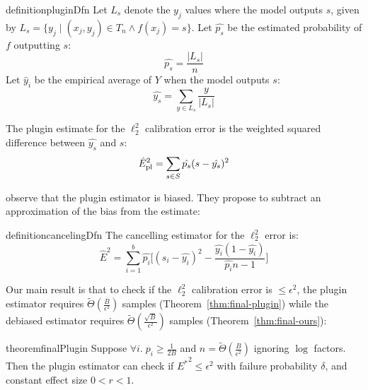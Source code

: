 \begin{restatable}{definition}{pluginDfn}
\label{dfn:plugin-estimator}
  Let $L_s$ denote the $y_j$ values where the model outputs $s$, given by $L_s = \{ y_j \; | \; (x_j, y_j) \in T_n\wedge f(x_j) = s \}$. Let $\hat{p_s}$ be the estimated probability of $f$ outputting $s$:
\[ \hat{p_s} = \frac{|L_s|}{n} \]
Let $\hat y_i$ be the empirical average of $Y$ when the model outputs $s$:
\[ \hat{y_s} = \sum_{y \in L_s} \frac{y}{|L_s|} \] 

  The plugin estimate for the $\ell_2^2$ calibration error is the weighted squared difference between $\hat{y_s}$ and $s$:
\[ \hat{E}_{\textup{pl}}^2{} = \sum_{s \in S} \hat{p_s} (s - \hat{y_s})^2 \]
\end{restatable}

\cite{brocker2012empirical, ferro2012bias} observe that the plugin estimator is biased. They propose to subtract an approximation of the bias from the estimate:

\begin{restatable}{definition}{cancelingDfn}
The cancelling estimator for the $\ell_2^2$ error is:
\[ \hat{E}^2 = \sum_{i=1}^b \hat{p_i} \Big[ (s_i - \hat{y_i})^2 - \frac{\hat{y_i}(1 - \hat{y_i})}{\hat{p_i}n-1} \Big] \]
\end{restatable}

Our main result is that to check if the $\ell_2^2$ calibration error is $\leq \epsilon^2$, the plugin estimator requires $\widetilde{\Theta}(\frac{B}{\epsilon^2})$ samples (Theorem~\ref{thm:final-plugin}) while the debiased estimator requires $\widetilde{\Theta}(\frac{\sqrt{B}}{\epsilon^2})$ samples (Theorem~\ref{thm:final-ours}): 

\begin{restatable}{theorem}{finalPlugin}
\label{thm:final-plugin}
  Suppose  $\forall i.\;p_i \geq \frac{1}{2B}$ and $n = \widetilde{\Theta}(\frac{B}{\epsilon^2})$ ignoring $\log$ factors. Then the plugin estimator can check if ${E^*}^2 \leq \epsilon^2$ with failure probability $\delta$, and constant effect size $0 < r < 1$. 
\end{restatable}

